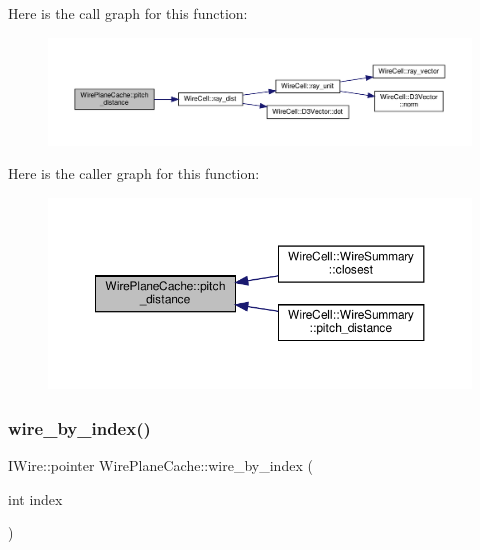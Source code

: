 Here is the call graph for this function\+:
\nopagebreak
\begin{figure}[H]
\begin{center}
\leavevmode
\includegraphics[width=350pt]{struct_wire_plane_cache_a01c8f094e36bf466517df1b9b4ee071d_cgraph}
\end{center}
\end{figure}
Here is the caller graph for this function\+:
\nopagebreak
\begin{figure}[H]
\begin{center}
\leavevmode
\includegraphics[width=350pt]{struct_wire_plane_cache_a01c8f094e36bf466517df1b9b4ee071d_icgraph}
\end{center}
\end{figure}
\mbox{\label{struct_wire_plane_cache_a96ab540b1fb5007eabd540fbae44cc62}} 
\subsubsection{\texorpdfstring{wire\+\_\+by\+\_\+index()}{wire\_by\_index()}}
{\footnotesize\ttfamily I\+Wire\+::pointer Wire\+Plane\+Cache\+::wire\+\_\+by\+\_\+index (\begin{DoxyParamCaption}\item[{int}]{index }\end{DoxyParamCaption})\hspace{0.3cm}{\ttfamily [inline]}}




